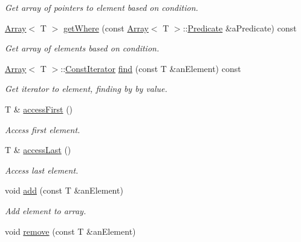 \begin{DoxyCompactItemize}
\begin{DoxyCompactList}\small\item\em Get array of pointers to element based on condition. \end{DoxyCompactList}\item 
\hyperlink{classlibrary_1_1core_1_1ctnr_1_1_array}{Array}$<$ T $>$ \hyperlink{classlibrary_1_1core_1_1ctnr_1_1_array_a62069b24d593b2265422cb8f3a149c44}{get\+Where} (const \hyperlink{classlibrary_1_1core_1_1ctnr_1_1_array}{Array}$<$ T $>$\+::\hyperlink{classlibrary_1_1core_1_1ctnr_1_1_array_a74cd325a740870aea490b6b739aa06ae}{Predicate} \&a\+Predicate) const
\begin{DoxyCompactList}\small\item\em Get array of elements based on condition. \end{DoxyCompactList}\item 
\hyperlink{classlibrary_1_1core_1_1ctnr_1_1_array}{Array}$<$ T $>$\+::\hyperlink{classlibrary_1_1core_1_1ctnr_1_1_array_ac26454f2a2ad4013873386a70aa25fc4}{Const\+Iterator} \hyperlink{classlibrary_1_1core_1_1ctnr_1_1_array_aeb8ed38b67b6031e27c188d89bd5cbbf}{find} (const T \&an\+Element) const
\begin{DoxyCompactList}\small\item\em Get iterator to element, finding by by value. \end{DoxyCompactList}\item 
T \& \hyperlink{classlibrary_1_1core_1_1ctnr_1_1_array_abb2068e46720e8df057b5410ac8879d5}{access\+First} ()
\begin{DoxyCompactList}\small\item\em Access first element. \end{DoxyCompactList}\item 
T \& \hyperlink{classlibrary_1_1core_1_1ctnr_1_1_array_ad6ea47ab09dfeebd6de0878d3ad2de25}{access\+Last} ()
\begin{DoxyCompactList}\small\item\em Access last element. \end{DoxyCompactList}\item 
void \hyperlink{classlibrary_1_1core_1_1ctnr_1_1_array_a388497f6bda07f69d61aa60099b991a8}{add} (const T \&an\+Element)
\begin{DoxyCompactList}\small\item\em Add element to array. \end{DoxyCompactList}\item 
void \hyperlink{classlibrary_1_1core_1_1ctnr_1_1_array_a8e295703797d6e41dad7a45e4101a6db}{remove} (const T \&an\+Element)

\end{DoxyCompactItemize}
